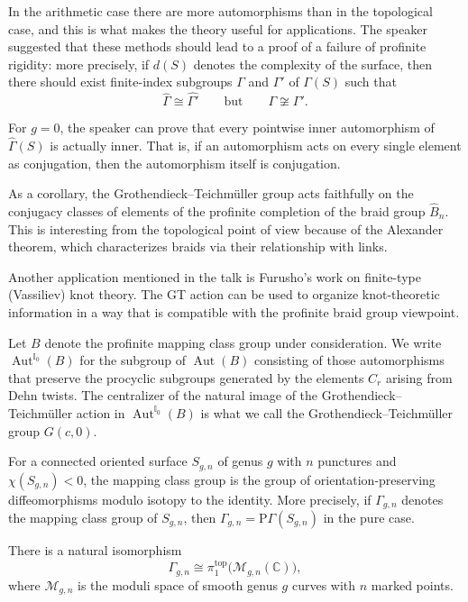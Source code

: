 \medskip\noindent
In the arithmetic case there are more
automorphisms than in the topological case,
and this is what makes the theory useful for
applications. The speaker suggested that
these methods should lead to a proof of a
failure of profinite rigidity: more
precisely, if \(d(S)\) denotes the complexity
of the surface, then there should exist
finite-index subgroups \(\Gamma\) and
\(\Gamma'\) of \(\Gamma(S)\) such that
$$
\widehat{\Gamma}\cong \widehat{\Gamma'}
\qquad\text{but}\qquad
\Gamma\not\cong \Gamma'.
$$

\medskip\noindent
For \(g=0\), the speaker can prove that every
pointwise inner automorphism of
\(\widehat{\Gamma}(S)\) is actually inner.
That is, if an automorphism acts on every
single element as conjugation, then the
automorphism itself is conjugation.

\medskip\noindent
As a corollary, the Grothendieck--Teichm\"uller
group acts faithfully on the conjugacy
classes of elements of the profinite
completion of the braid group
\(\widehat{B}_n\). This is interesting from
the topological point of view because of the
Alexander theorem, which characterizes
braids via their relationship with links.

\medskip\noindent
Another application mentioned in the talk is
Furusho's work on finite-type (Vassiliev)
knot theory. The GT action can be used to
organize knot-theoretic information in a way
that is compatible with the profinite braid
group viewpoint.

\medskip\noindent
Let $B$ denote the profinite mapping class
group under consideration. We write
\(\operatorname{Aut}^{\mathbb{I}_0}(B)\) for
the subgroup of \(\operatorname{Aut}(B)\)
consisting of those automorphisms that
preserve the procyclic subgroups generated by
the elements \(C_r\) arising from Dehn
twists. The centralizer of the natural image
of the Grothendieck--Teichm\"uller action in
\(\operatorname{Aut}^{\mathbb{I}_0}(B)\) is
what we call the Grothendieck--Teichm\"uller
group \(G(c,0)\).

\medskip\noindent
For a connected oriented surface
\(S_{g,n}\) of genus \(g\) with \(n\)
punctures and \(\chi(S_{g,n})<0\), the
mapping class group is
the group of orientation-preserving
diffeomorphisms modulo isotopy to the
identity. More precisely, if
\(\Gamma_{g,n}\) denotes the mapping class
group of \(S_{g,n}\), then
\(\Gamma_{g,n}=\mathrm{P}\Gamma(S_{g,n})\)
in the pure case.

\begin{theorem}\label{thm:mapping-class-moduli-space}
There is a natural isomorphism
$$
\Gamma_{g,n}\cong
\pi_1^{\mathrm{top}}
\bigl(\mathcal{M}_{g,n}(\mathbb{C})\bigr),
$$
where \(\mathcal{M}_{g,n}\) is the moduli
space of smooth genus \(g\) curves with
\(n\) marked points.
\end{theorem}

